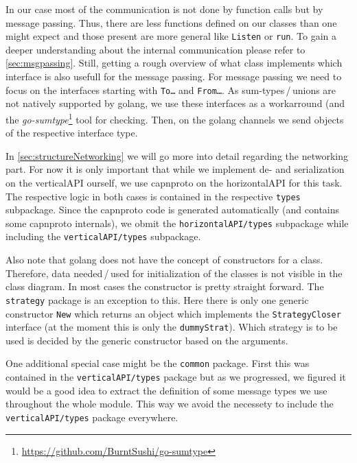 \documentclass[a4paper,english,10pt,NET]{tumarticle}
\begin{document}
In our case most of the communication is not done by function calls but by message passing.
Thus, there are less functions defined on our classes than one might expect and those present are more general like \texttt{Listen} or \texttt{run}.
To gain a deeper understanding about the internal communication please refer to \cref{sec:msgpassing}.
Still, getting a rough overview of what class implements which interface is also usefull for the message passing.
For message passing we need to focus on the interfaces starting with \texttt{To\ldots} and \texttt{From\ldots}.
As sum-types\,/\,unions are not natively supported by golang, we use these interfaces as a workarround (and the \emph{go-sumtype}\footnote{\url{https://github.com/BurntSushi/go-sumtype}} tool for checking.
Then, on the golang channels we send objects of the respective interface type.

In \cref{sec:structureNetworking} we will go more into detail regarding the networking part.
For now it is only important that while we implement de- and serialization on the verticalAPI ourself, we use capnproto on the horizontalAPI for this task.
The respective logic in both cases is contained in the respective \texttt{types} subpackage.
Since the capnproto code is generated automatically (and contains some capnproto internals), we obmit the \texttt{horizontalAPI/types} subpackage while including the \texttt{verticalAPI/types} subpackage.

Also note that golang does not have the concept of constructors for a class.
Therefore, data needed\,/\,used for initialization of the classes is not visible in the class diagram.
In most cases the constructor is pretty straight forward.
The \texttt{strategy} package is an exception to this.
Here there is only one generic constructor \texttt{New} which returns an object which implements the \texttt{StrategyCloser} interface (at the moment this is only the \texttt{dummyStrat}).
Which strategy is to be used is decided by the generic constructor based on the arguments.

One additional special case might be the \texttt{common} package.
First this was contained in the \texttt{verticalAPI/types} package but as we progressed, we figured it would be a good idea to extract the definition of some message types we use throughout the whole module.
This way we avoid the necessety to include the \texttt{verticalAPI/types} package everywhere.
\end{document}

